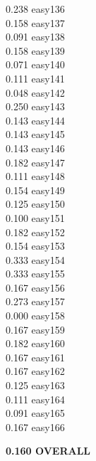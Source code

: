 \documentclass[10pt]{article}
\begin{document}
\begin{enumerate}
\begin{enumerate}
\begin{multicols}{5}
            0.238 easy136\\
            0.158 easy137\\
            0.091 easy138\\
            0.158 easy139\\
            0.071 easy140\\
            0.111 easy141\\
            0.048 easy142\\
            0.250 easy143\\
            0.143 easy144\\
            0.143 easy145\\
            0.143 easy146\\
            0.182 easy147\\
            0.111 easy148\\
            0.154 easy149\\
            0.125 easy150\\
            0.100 easy151\\
            0.182 easy152\\
            0.154 easy153\\
            0.333 easy154\\
            0.333 easy155\\
            0.167 easy156\\
            0.273 easy157\\
            0.000 easy158\\
            0.167 easy159\\
            0.182 easy160\\
            0.167 easy161\\
            0.167 easy162\\
            0.125 easy163\\
            0.111 easy164\\
            0.091 easy165\\
            0.167 easy166\\
            \end{multicols}
            \textbf{0.160 OVERALL}\\
            

\end{enumerate}
\end{enumerate}
\end{document}
